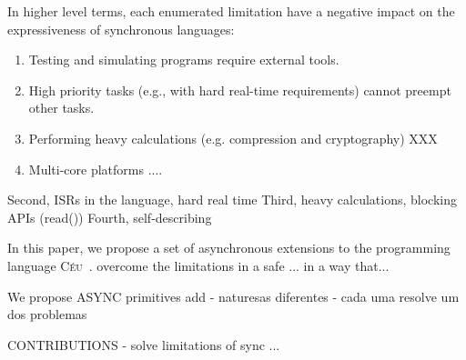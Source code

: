 \documentclass[11pt,a4paper]{article}
\newcommand{\CEU}{\textsc{C\'{e}u}}
\begin{document}
In higher level terms, each enumerated limitation have a negative impact on the 
expressiveness of synchronous languages:
%
\begin{enumerate}
\item Testing and simulating programs require external tools.
\item High priority tasks (e.g., with hard real-time requirements) cannot 
        preempt other tasks.
\item Performing heavy calculations (e.g. compression and cryptography) XXX
\item Multi-core platforms ....
\end{enumerate}

Second, ISRs in the language, hard real time
Third, heavy calculations, blocking APIs (read())
Fourth, self-describing

In this paper, we propose a set of asynchronous extensions to the programming 
language \CEU~\cite{TODO}.
%
overcome the limitations in a safe ...
in a way that...

We propose
ASYNC primitives add
- naturesas diferentes
- cada uma resolve um dos problemas

CONTRIBUTIONS
- solve limitations of sync
...
\end{document}
